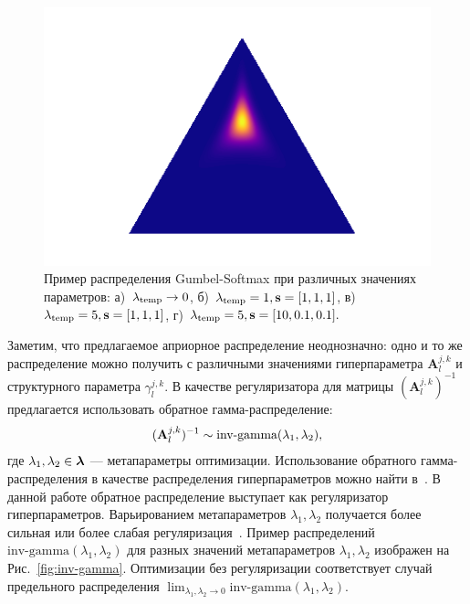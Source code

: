 \begin{figure}
\begin{minipage}[t]{.2\textwidth}
\subcaption{}
\end{minipage}
\hfill
 \begin{minipage}[t]{.2\textwidth}
   \includegraphics[width=\textwidth]{plots/notebooks/gs5_shift.png}
\subcaption{}
\end{minipage}

\caption{Пример распределения Gumbel-Softmax при различных значениях параметров: а)~$\lambda_{\text{temp}}\to0$, б)~$\lambda_{\text{temp}}=1, \mathbf{s}=[1,1,1]$, в)~$\lambda_{\text{temp}}=5, \mathbf{s}=[1,1,1]$, г)~$\lambda_{\text{temp}}=5, \mathbf{s}=[10,0.1,0.1].$}
\label{fig:gs}

\end{figure}


Заметим, что предлагаемое априорное распределение неоднозначно: одно и то же распределение  можно получить с различными значениями гиперпараметра $\mathbf{A}^{j,k}_l$ и структурного параметра $\gamma^{j,k}_l$. В качестве регуляризатора для матрицы $(\mathbf{A}^{j,k}_l)^{-1}$ предлагается использовать обратное гамма-распределение:
\[
    (\mathbf{A}^{j,k}_l)^{-1} \sim \text{inv-gamma}(\lambda_1,\lambda_2),
\]
где $\lambda_1,\lambda_2 \in \boldsymbol{\lambda}$ --- метапараметры оптимизации. 
Использование обратного гамма-распределения в качестве распределения гиперпараметров можно найти в~\cite{bishop,mackay}. В данной работе обратное распределение выступает как регуляризатор гиперпараметров.
Варьированием метапараметров $\lambda_1,\lambda_2$ получается  более сильная или более слабая регуляризация~\cite{rvm}. Пример распределений $\text{inv-gamma}(\lambda_1,\lambda_2)$ для разных значений метапараметров $\lambda_1,\lambda_2$ изображен на Рис.~\ref{fig:inv-gamma}. Оптимизации без регуляризации соответствует случай предельного распределения $\lim_{\lambda_1,\lambda_2\to 0}\text{inv-gamma}(\lambda_1, \lambda_2)$.

